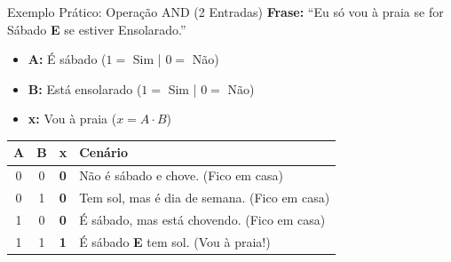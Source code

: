 \begin{frame}{Exemplo Prático: Operação AND (2 Entradas)}
    \textbf{Frase:} ``Eu só vou à praia se for Sábado \textbf{E} se estiver Ensolarado.''
    \vspace{0.4cm}
    \begin{itemize}
        \item \textbf{A:} É sábado ($1 = $ Sim | $0 = $ Não)
        \item \textbf{B:} Está ensolarado ($1 = $ Sim | $0 = $ Não)
        \item \textbf{x:} Vou à praia ($x = A \cdot B$)
    \end{itemize}
    \vspace{0.2cm}
    \begin{table}
        \centering
        \begin{tabular}{|c|c||c|l|}
            \hline
            \textbf{A} & \textbf{B} & \textbf{x} & \textbf{Cenário}                             \\ \hline
            0          & 0          & \textbf{0} & Não é sábado e chove. (Fico em casa)         \\ \hline
            0          & 1          & \textbf{0} & Tem sol, mas é dia de semana. (Fico em casa) \\ \hline
            1          & 0          & \textbf{0} & É sábado, mas está chovendo. (Fico em casa)  \\ \hline
            1          & 1          & \textbf{1} & É sábado \textbf{E} tem sol. (Vou à praia!)  \\ \hline
        \end{tabular}
    \end{table}
\end{frame}


